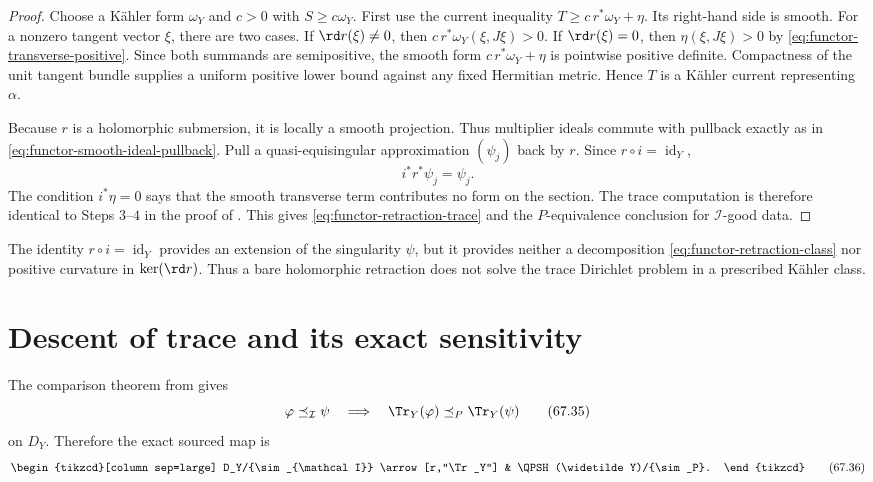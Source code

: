 \begin{proof}
Choose a K\"ahler form $\omega_Y$ and $c>0$ with
$S\geq c\omega_Y$. First use the current inequality
$T\geq c\,r^*\omega_Y+\eta$. Its right-hand side is smooth.
For a nonzero tangent vector $\xi$, there are two cases. If $\rd r(\xi)\neq0$, then
$c\,r^*\omega_Y(\xi,J\xi)>0$. If
$\rd r(\xi)=0$, then $\eta(\xi,J\xi)>0$ by
\eqref{eq:functor-transverse-positive}. Since both summands are
semipositive, the smooth form $c\,r^*\omega_Y+\eta$ is pointwise positive definite. Compactness of the
unit tangent bundle supplies a uniform positive lower bound against any
fixed Hermitian metric. Hence $T$ is a K\"ahler current representing
$\alpha$.

Because $r$ is a holomorphic submersion, it is locally a smooth
projection. Thus multiplier ideals commute with pullback exactly as in
\eqref{eq:functor-smooth-ideal-pullback}. Pull a quasi-equisingular
approximation $(\psi_j)$ back by $r$. Since
$r\circ i=\operatorname{id}_Y$,
\[
                         i^*r^*\psi_j=\psi_j.
\tag{67.34}\label{eq:functor-retraction-approximation}
\]
The condition $i^*\eta=0$ says that the smooth transverse term
contributes no form on the section. The trace computation is therefore
identical to Steps $3$--$4$ in the proof of
. This gives
\eqref{eq:functor-retraction-trace} and the
$P$-equivalence conclusion for $\mathcal I$-good data.
\end{proof}

\begin{remark}
\label{rem:functor-bare-retraction}
The identity $r\circ i=\operatorname{id}_Y$ provides an extension of the
singularity $\psi$, but it provides neither a decomposition
\eqref{eq:functor-retraction-class} nor positive curvature in
$\ker(\rd r)$. Thus a bare holomorphic retraction does not solve the
trace Dirichlet problem in a prescribed K\"ahler class.
\end{remark}

\section{Descent of trace and its exact sensitivity}
\label{sec:functor-trace-descent}

The comparison theorem from  gives
\[
 \varphi\preceq_{\mathcal I}\psi
 \quad\Longrightarrow\quad
 \Tr_Y(\varphi)\preceq_P\Tr_Y(\psi)
\tag{67.35}\label{eq:functor-trace-order}
\]
on $D_Y$. Therefore the exact sourced map is
\[
\begin{tikzcd}[column sep=large]
D_Y/{\sim_{\mathcal I}}
 \arrow[r,"\Tr_Y"]
&
\QPSH(\widetilde Y)/{\sim_P}.
\end{tikzcd}
\tag{67.36}\label{eq:functor-trace-factorization}
\]

